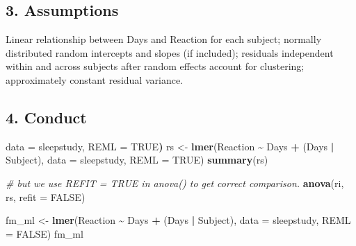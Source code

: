 \documentclass[
]{article}
\newenvironment{Shaded}{\begin{snugshade}}{\end{snugshade}}
\newcommand{\AttributeTok}[1]{\textcolor[rgb]{0.13,0.29,0.53}{#1}}
\newcommand{\CommentTok}[1]{\textcolor[rgb]{0.56,0.35,0.01}{\textit{#1}}}
\newcommand{\ConstantTok}[1]{\textcolor[rgb]{0.56,0.35,0.01}{#1}}
\newcommand{\ErrorTok}[1]{\textcolor[rgb]{0.64,0.00,0.00}{\textbf{#1}}}
\newcommand{\FunctionTok}[1]{\textcolor[rgb]{0.13,0.29,0.53}{\textbf{#1}}}
\newcommand{\NormalTok}[1]{#1}
\newcommand{\OtherTok}[1]{\textcolor[rgb]{0.56,0.35,0.01}{#1}}
\newcommand{\SpecialCharTok}[1]{\textcolor[rgb]{0.81,0.36,0.00}{\textbf{#1}}}
\begin{document}
\subsection{3. Assumptions}\label{assumptions}

Linear relationship between Days and Reaction for each subject; normally
distributed random intercepts and slopes (if included); residuals
independent within and across subjects after random effects account for
clustering; approximately constant residual variance.

\subsection{4. Conduct}\label{conduct}

\begin{Shaded}
\begin{Highlighting}[]
\NormalTok{           data }\OtherTok{=}\NormalTok{ sleepstudy, REML }\OtherTok{=} \ConstantTok{TRUE}\ErrorTok{)}
\NormalTok{rs }\OtherTok{\textless{}{-}} \FunctionTok{lmer}\NormalTok{(Reaction }\SpecialCharTok{\textasciitilde{}}\NormalTok{ Days }\SpecialCharTok{+}\NormalTok{ (Days }\SpecialCharTok{|}\NormalTok{ Subject),}
           \AttributeTok{data =}\NormalTok{ sleepstudy, }\AttributeTok{REML =} \ConstantTok{TRUE}\NormalTok{)}
\FunctionTok{summary}\NormalTok{(rs)}
\end{Highlighting}
\end{Shaded}

\begin{Shaded}
\begin{Highlighting}[]
\CommentTok{\# but we use REFIT = TRUE in anova() to get correct comparison.}
\FunctionTok{anova}\NormalTok{(ri, rs, }\AttributeTok{refit =} \ConstantTok{FALSE}\NormalTok{)}
\end{Highlighting}
\end{Shaded}

\begin{Shaded}
\begin{Highlighting}[]
\NormalTok{fm\_ml }\OtherTok{\textless{}{-}} \FunctionTok{lmer}\NormalTok{(Reaction }\SpecialCharTok{\textasciitilde{}}\NormalTok{ Days }\SpecialCharTok{+}\NormalTok{ (Days }\SpecialCharTok{|}\NormalTok{ Subject),}
              \AttributeTok{data =}\NormalTok{ sleepstudy, }\AttributeTok{REML =} \ConstantTok{FALSE}\NormalTok{)}
\NormalTok{fm\_ml}
\end{Highlighting}
\end{Shaded}
\end{document}
